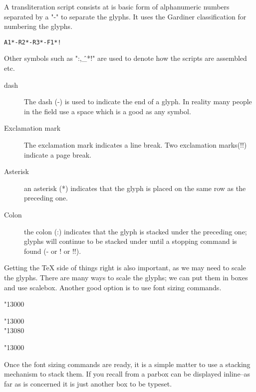 A transliteration script consists at is basic form of alphanumeric numbers separated by a "-" to separate the glyphs. It uses the Gardiner classification for numbering the glyphs.

\begin{center}
\texttt{A1*-R2*-R3*-F1*!}
\end{center}

Other symbols such as ":,\^\_*!" are used to denote how the scripts are assembled etc.

\begin{description}
\item [dash]
The dash (-) is used to indicate the end of a glyph. In reality many people in the field use a space which is a good as any symbol. 
\item [Exclamation mark] The exclamation mark indicates a line break. Two exclamation marks(!!) indicate a page break.

\item [Asterisk] an asterisk (*) indicates that the glyph is placed on the same row as the preceding one.

\item[Colon] the colon (:) indicates that the glyph is stacked under the preceding one; glyphs will continue to be stacked under until a stopping command is found (- or ! or !!).

\end{description}

Getting the TeX side of things right is also important, as we may need to scale the glyphs. There are many ways to scale the glyphs; we can put them in boxes and use scalebox. Another good option is to use font sizing commands.

\begin{center}

{\hiero\fontsize{2cm}{0.5em}\selectfont \char"13000}
{\hiero\fontsize{1cm}{0.25em}\selectfont 
\parbox[b]{1cm}{\hiero\char"13000\\ \char"13080}
}
{
\hiero\fontsize{0.66cm}{0.5em}\selectfont 
{}
\hiero\fontsize{2cm}{0.5em}\selectfont \char"13000
}



\end{center}

Once the font sizing commands are ready, it is a simple matter to use a stacking mechanism to stack them. If you recall from a parbox can be displayed inline--as far as \tex is concerned it is just another box to be typeset.  

